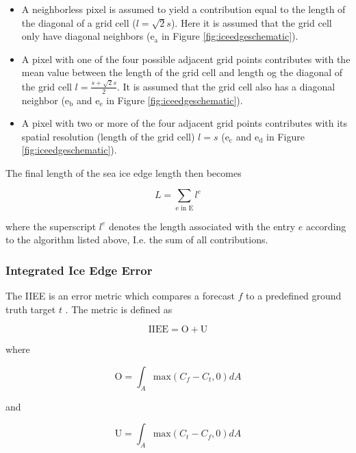 \documentclass[../main/thesis.tex]{subfiles}
\begin{document}
\begin{itemize}
    \item A neighborless pixel is assumed to yield a contribution equal to the length of the diagonal of a grid cell ($l = \sqrt2s$). Here it is assumed that the grid cell only have diagonal neighbors ($\text{e}_\text{a}$ in Figure \ref{fig:iceedgeschematic}).
    \item A pixel with one of the four possible adjacent grid points contributes with the mean value between the length of the grid cell and length og the diagonal of the grid cell $l = \frac{s + \sqrt2s}{2}$. It is assumed that the grid cell also has a diagonal neighbor ($\text{e}_\text{b}$ and $\text{e}_\text{e}$ in Figure \ref{fig:iceedgeschematic}).
    \item A pixel with two or more of the four adjacent grid points contributes with its spatial resolution (length of the grid cell) $l = s$ ($\text{e}_\text{c}$ and $\text{e}_\text{d}$ in Figure \ref{fig:iceedgeschematic}).
\end{itemize}

The final length of the sea ice edge length then becomes

\begin{equation}
    \label{eq:ice-edge-length}
    L = \sum_\text{e in E} l^e
\end{equation}

where the superscript $l^e$ denotes the length associated with the entry $e$ according to the algorithm listed above, I.e. the sum of all contributions.

\subsubsection{Integrated Ice Edge Error}
\label{sec:iiee}
The IIEE is an error metric which compares a forecast $f$ to a predefined ground truth target $t$ \citet{Goessling2016}. The metric is defined as

\begin{equation}
    \label{eq:IIEE}
    \text{IIEE} = \text{O} + \text{U}
\end{equation}

where 

\begin{equation}
    \label{eq:a_plus}
    \text{O} = \int_A\text{max}(C_f - C_t, 0)dA
\end{equation}

and

\begin{equation}
    \label{eq:a_minus}
    \text{U} = \int_A\text{max}(C_t - C_f, 0)dA
\end{equation}
\end{document}
